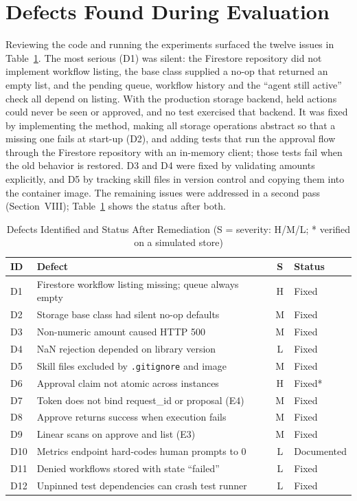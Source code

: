 \documentclass[conference]{IEEEtran}
\begin{document}
\section{Defects Found During Evaluation}
Reviewing the code and running the experiments surfaced the twelve issues in Table~\ref{tab:defects}. The most serious (D1) was silent: the Firestore repository did not implement workflow listing, the base class supplied a no-op that returned an empty list, and the pending queue, workflow history and the ``agent still active'' check all depend on listing. With the production storage backend, held actions could never be seen or approved, and no test exercised that backend. It was fixed by implementing the method, making all storage operations abstract so that a missing one fails at start-up (D2), and adding tests that run the approval flow through the Firestore repository with an in-memory client; those tests fail when the old behavior is restored. D3 and D4 were fixed by validating amounts explicitly, and D5 by tracking skill files in version control and copying them into the container image. The remaining issues were addressed in a second pass (Section~VIII); Table~\ref{tab:defects} shows the status after both.

\begin{table}[t]
\caption{Defects Identified and Status After Remediation (S = severity: H/M/L; * verified on a simulated store)}
\label{tab:defects}
\centering
\begin{tabular}{|l|p{4.6cm}|c|l|}
\hline
\textbf{ID} & \textbf{Defect} & \textbf{S} & \textbf{Status} \\
\hline
D1 & Firestore workflow listing missing; queue always empty & H & Fixed \\
D2 & Storage base class had silent no-op defaults & M & Fixed \\
D3 & Non-numeric amount caused HTTP 500 & M & Fixed \\
D4 & NaN rejection depended on library version & L & Fixed \\
D5 & Skill files excluded by \texttt{.gitignore} and image & M & Fixed \\
D6 & Approval claim not atomic across instances & H & Fixed* \\
D7 & Token does not bind request\_id or proposal (E4) & M & Fixed \\
D8 & Approve returns success when execution fails & M & Fixed \\
D9 & Linear scans on approve and list (E3) & M & Fixed \\
D10 & Metrics endpoint hard-codes human prompts to 0 & L & Documented \\
D11 & Denied workflows stored with state ``failed'' & L & Fixed \\
D12 & Unpinned test dependencies can crash test runner & L & Fixed \\
\hline
\end{tabular}
\end{table}
\end{document}
